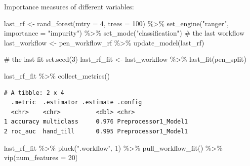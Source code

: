 \documentclass[
  letterpaper,
  DIV=11,
  numbers=noendperiod]{scrreprt}
\newenvironment{Shaded}{\begin{snugshade}}{\end{snugshade}}
\newcommand{\AttributeTok}[1]{\textcolor[rgb]{0.40,0.45,0.13}{#1}}
\newcommand{\CommentTok}[1]{\textcolor[rgb]{0.37,0.37,0.37}{#1}}
\newcommand{\DecValTok}[1]{\textcolor[rgb]{0.68,0.00,0.00}{#1}}
\newcommand{\FunctionTok}[1]{\textcolor[rgb]{0.28,0.35,0.67}{#1}}
\newcommand{\NormalTok}[1]{\textcolor[rgb]{0.00,0.23,0.31}{#1}}
\newcommand{\OtherTok}[1]{\textcolor[rgb]{0.00,0.23,0.31}{#1}}
\newcommand{\SpecialCharTok}[1]{\textcolor[rgb]{0.37,0.37,0.37}{#1}}
\newcommand{\StringTok}[1]{\textcolor[rgb]{0.13,0.47,0.30}{#1}}
\begin{document}
Importance measures of different variables:

\begin{Shaded}
\begin{Highlighting}[]
\NormalTok{last\_rf }\OtherTok{\textless{}{-}} 
  \FunctionTok{rand\_forest}\NormalTok{(}\AttributeTok{mtry =} \DecValTok{4}\NormalTok{, }\AttributeTok{trees =} \DecValTok{100}\NormalTok{) }\SpecialCharTok{\%\textgreater{}\%} 
  \FunctionTok{set\_engine}\NormalTok{(}\StringTok{"ranger"}\NormalTok{,  }\AttributeTok{importance =} \StringTok{"impurity"}\NormalTok{) }\SpecialCharTok{\%\textgreater{}\%} 
  \FunctionTok{set\_mode}\NormalTok{(}\StringTok{"classification"}\NormalTok{)}
\CommentTok{\# the last workflow}
\NormalTok{last\_workflow }\OtherTok{\textless{}{-}} 
\NormalTok{  pen\_workflow\_rf }\SpecialCharTok{\%\textgreater{}\%} 
  \FunctionTok{update\_model}\NormalTok{(last\_rf)}

\CommentTok{\# the last fit}
\FunctionTok{set.seed}\NormalTok{(}\DecValTok{3}\NormalTok{)}
\NormalTok{last\_rf\_fit }\OtherTok{\textless{}{-}} 
\NormalTok{  last\_workflow }\SpecialCharTok{\%\textgreater{}\%} 
  \FunctionTok{last\_fit}\NormalTok{(pen\_split)}
\end{Highlighting}
\end{Shaded}

\begin{Shaded}
\begin{Highlighting}[]
\NormalTok{last\_rf\_fit }\SpecialCharTok{\%\textgreater{}\%} 
  \FunctionTok{collect\_metrics}\NormalTok{()}
\end{Highlighting}
\end{Shaded}

\begin{verbatim}
# A tibble: 2 x 4
  .metric  .estimator .estimate .config             
  <chr>    <chr>          <dbl> <chr>               
1 accuracy multiclass     0.976 Preprocessor1_Model1
2 roc_auc  hand_till      0.995 Preprocessor1_Model1
\end{verbatim}

\begin{Shaded}
\begin{Highlighting}[]
\NormalTok{last\_rf\_fit }\SpecialCharTok{\%\textgreater{}\%} 
  \FunctionTok{pluck}\NormalTok{(}\StringTok{".workflow"}\NormalTok{, }\DecValTok{1}\NormalTok{) }\SpecialCharTok{\%\textgreater{}\%}   
  \FunctionTok{pull\_workflow\_fit}\NormalTok{() }\SpecialCharTok{\%\textgreater{}\%} 
  \FunctionTok{vip}\NormalTok{(}\AttributeTok{num\_features =} \DecValTok{20}\NormalTok{)}
\end{Highlighting}
\end{Shaded}
\end{document}
